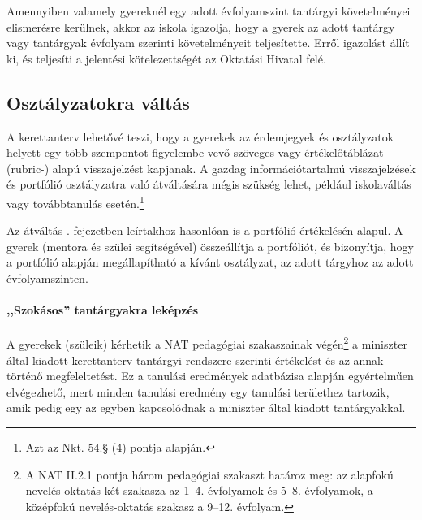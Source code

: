 Amennyiben valamely gyereknél egy adott évfolyamszint tantárgyi követelményei
elismerésre kerülnek, akkor az iskola igazolja, hogy a gyerek az adott tantárgy
vagy tantárgyak évfolyam szerinti követelményeit teljesítette.
Erről igazolást állít ki, és teljesíti a jelentési kötelezettségét az Oktatási
Hivatal felé.

\subsection{Osztályzatokra váltás}
\label{sec:osztalyzatok}
A kerettanterv lehetővé teszi, hogy a gyerekek az érdemjegyek
és osztályzatok
helyett egy több szempontot figyelembe vevő szöveges vagy értékelőtáblázat-
(rubric-) alapú visszajelzést kapjanak.
A gazdag információtartalmú visszajelzések és portfólió osztályzatra való
átváltására mégis szükség lehet, például iskolaváltás vagy továbbtanulás
esetén.\footnote{Azt az Nkt. 54.§ (4) pontja alapján.}

Az átváltás .
fejezetben leírtakhoz
hasonlóan is a portfólió értékelésén alapul.
A gyerek (mentora és szülei segítségével) összeállítja a portfóliót, és
bizonyítja, hogy a portfólió alapján megállapítható a kívánt osztályzat, az
adott tárgyhoz az adott évfolyamszinten.

\paragraph{,,Szokásos'' tantárgyakra leképzés}
A gyerekek (szüleik) kérhetik a NAT pedagógiai szakaszainak
végén\footnote{A NAT II.2.1 pontja három pedagógiai szakaszt határoz meg: az
      alapfokú nevelés-oktatás két szakasza az 1--4. évfolyamok és 5--8.
      évfolyamok,
      a középfokú nevelés-oktatás szakasz a 9--12. évfolyam.}
a miniszter
által kiadott kerettanterv tantárgyi rendszere szerinti értékelést és az annak
történő megfeleltetést. Ez a tanulási eredmények adatbázisa alapján
egyértelműen elvégezhető, mert minden tanulási eredmény egy tanulási területhez
tartozik, amik pedig egy az egyben kapcsolódnak a miniszter által kiadott
tantárgyakkal.

